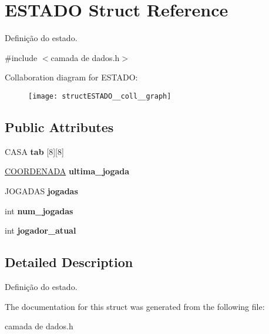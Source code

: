 \hypertarget{structESTADO}{}\section{E\+S\+T\+A\+DO Struct Reference}
\label{structESTADO}


Definição do estado.  




{\ttfamily \#include $<$camada de dados.\+h$>$}



Collaboration diagram for E\+S\+T\+A\+DO\+:\nopagebreak
\begin{figure}[H]
\begin{center}
\leavevmode
\texttt{[image: structESTADO\_\_coll\_\_graph]}
\end{center}
\end{figure}
\subsection*{Public Attributes}
\begin{DoxyCompactItemize}
\item 
\mbox{\label{structESTADO_ab56f0f1be16954d3768b4174d14c087d}} 
C\+A\+SA {\bfseries tab} \mbox{[}8\mbox{]}\mbox{[}8\mbox{]}
\item 
\mbox{\label{structESTADO_a4896a5c5c1f40b43fb795623327e3f47}} 
\hyperlink{structCOORDENADA}{C\+O\+O\+R\+D\+E\+N\+A\+DA} {\bfseries ultima\+\_\+jogada}
\item 
\mbox{\label{structESTADO_afae43b87a488fad0f2b56a18bad31d18}} 
J\+O\+G\+A\+D\+AS {\bfseries jogadas}
\item 
\mbox{\label{structESTADO_a261495728744647e618b4e623f5a4b7a}} 
int {\bfseries num\+\_\+jogadas}
\item 
\mbox{\label{structESTADO_a5dd28e2e68b7aef2b6b7ea88e02eff58}} 
int {\bfseries jogador\+\_\+atual}
\end{DoxyCompactItemize}


\subsection{Detailed Description}
Definição do estado. 

The documentation for this struct was generated from the following file\+:\begin{DoxyCompactItemize}
\item 
camada de dados.\+h\end{DoxyCompactItemize}
